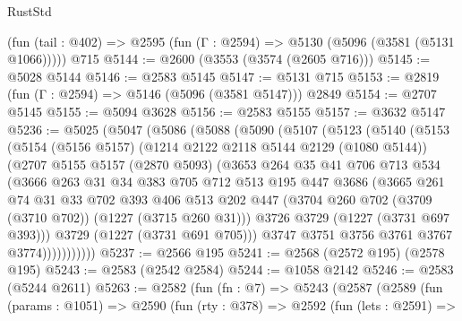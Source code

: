 \begin{lexlean}{RustStd}
\begin{coremodule}
    (fun (tail : @402) => @2595 (fun (Γ : @2594) => @5130 (@5096 (@3581 (@5131 @1066)))))
    @715
@5144 := @2600 (@3553 (@3574 (@2605 @716)))
@5145 := @5028 @5144
@5146 := @2583 @5145
@5147 := @5131 @715
@5153 := @2819 (fun (Γ : @2594) => @5146 (@5096 (@3581 @5147))) @2849
@5154 := @2707 @5145
@5155 := @5094 @3628
@5156 := @2583 @5155
@5157 := @3632 @5147
@5236 := @5025
    (@5047
      (@5086
        (@5088
          (@5090
            (@5107
              (@5123
                (@5140
                  (@5153
                    (@5154
                      (@5156 @5157)
                      (@1214 @2122 @2118 @5144 @2129 (@1080 @5144))
                      (@2707
                        @5155
                        @5157
                        (@2870 @5093)
                        (@3653
                          @264
                          @35
                          @41
                          @706
                          @713
                          @534
                          (@3666
                            @263
                            @31
                            @34
                            @383
                            @705
                            @712
                            @513
                            @195
                            @447
                            @3686
                            (@3665
                              @261
                              @74
                              @31
                              @33
                              @702
                              @393
                              @406
                              @513
                              @202
                              @447
                              (@3704 @260 @702 (@3709 (@3710 @702)) (@1227 (@3715 @260 @31)))
                              @3726
                              @3729
                              (@1227 (@3731 @697 @393)))
                            @3729
                            (@1227 (@3731 @691 @705)))
                          @3747
                          @3751
                          @3756
                          @3761
                          @3767
                          @3774)))))))))))
@5237 := @2566 @195
@5241 := @2568 (@2572 @195) (@2578 @195)
@5243 := @2583 (@2542 @2584)
@5244 := @1058 @2142
@5246 := @2583 (@5244 @2611)
@5263 := @2582
    (fun (fn : @7) =>
    @5243
      (@2587
        (@2589
          (fun (params : @1051) =>
          @2590
            (fun (rty : @378) =>
            @2592
              (fun (lets : @2591) =>

\end{coremodule}
\end{lexlean}
